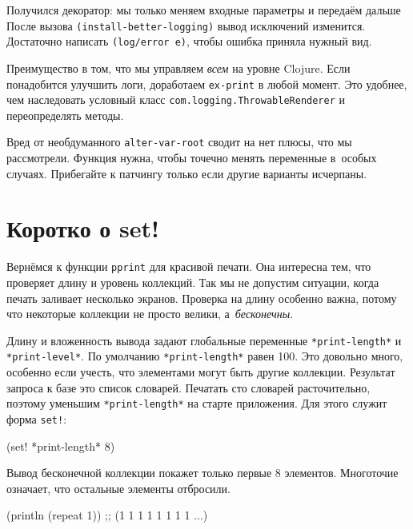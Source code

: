 Получился декоратор: мы только меняем входные параметры и передаём дальше После
вызова \verb|(install-better-logging)| вывод исключений изменится. Достаточно
написать \verb|(log/error e)|, чтобы ошибка приняла нужный вид.

Преимущество в том, что мы управляем \emph{всем} на уровне Clojure. Если
понадобится улучшить логи, доработаем \verb|ex-print| в любой момент. Это
удобнее, чем наследовать условный класс \verb|com.logging.ThrowableRenderer| и
переопределять методы.

Вред от необдуманного \verb|alter-var-root| сводит на нет плюсы, что мы
рассмотрели. Функция нужна, чтобы точечно менять переменные в~особых
случаях. Прибегайте к патчингу только если другие варианты исчерпаны.

\section{Коротко о set!}


Вернёмся к функции \verb|pprint| для красивой печати. Она интересна тем, что
проверяет длину и уровень коллекций. Так мы не допустим ситуации, когда печать
заливает несколько экранов. Проверка на длину особенно важна, потому что
некоторые коллекции не просто велики, а~\emph{бесконечны}.


Длину и вложенность вывода задают глобальные переменные \verb|*print-length*|
и \verb|*print-level*|. По умолчанию \verb|*print-length*| равен 100. Это
довольно много, особенно если учесть, что элементами могут быть другие
коллекции. Результат запроса к базе это список словарей. Печатать сто
словарей расточительно, поэтому уменьшим \verb|*print-length*| на старте
приложения. Для этого служит форма \verb|set!|:

\begin{english}
  \begin{clojure}
(set! *print-length* 8)
  \end{clojure}
\end{english}

\noindent
Вывод бесконечной коллекции покажет только первые 8 элементов. Многоточие
означает, что остальные элементы отбросили.

\begin{english}
  \begin{clojure}
(println (repeat 1))
;; (1 1 1 1 1 1 1 1 ...)
  \end{clojure}
\end{english}

